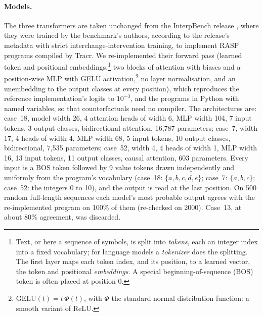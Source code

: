\documentclass[11pt,a4paper]{article}
\begin{document}
\paragraph{Models.} The three transformers are taken unchanged from the InterpBench release \cite{interpbench2024}, where they were trained by the benchmark's authors, according to the release's metadata with strict interchange-intervention training, to implement RASP programs compiled by Tracr. We re-implemented their forward pass (learned token and positional embeddings,\footnote{Text, or here a sequence of symbols, is split into \emph{tokens}, each an integer index into a fixed vocabulary; for language models a \emph{tokenizer} does the splitting. The first layer maps each token index, and its position, to a learned vector, the token and positional \emph{embeddings}. A special beginning-of-sequence (BOS) token is often placed at position 0.} two blocks of attention with biases and a position-wise MLP with GELU activation,\footnote{$\mathrm{GELU}(t)=t\,\Phi(t)$, with $\Phi$ the standard normal distribution function: a smooth variant of ReLU.} no layer normalisation, and an unembedding to the output classes at every position), which reproduces the reference implementation's logits to $10^{-3}$, and the programs in Python with named variables, so that counterfactuals need no compiler. The architectures are: case~18, model width 26, 4 attention heads of width 6, MLP width 104, 7 input tokens, 3 output classes, bidirectional attention, 16{,}787 parameters; case~7, width 17, 4 heads of width 4, MLP width 68, 5 input tokens, 10 output classes, bidirectional, 7{,}535 parameters; case~52, width 4, 4 heads of width 1, MLP width 16, 13 input tokens, 11 output classes, causal attention, 603 parameters. Every input is a BOS token followed by 9 value tokens drawn independently and uniformly from the program's vocabulary (case~18: $\{a,b,c,d,e\}$; case~7: $\{a,b,c\}$; case~52: the integers 0 to 10), and the output is read at the last position. On 500 random full-length sequences each model's most probable output agrees with the re-implemented program on 100\% of them (re-checked on 2000). Case~13, at about 80\% agreement, was discarded.
\end{document}
